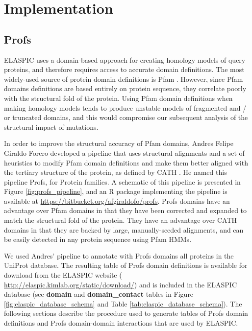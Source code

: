 
\chapter{Implementation} \label{ch:implementation}


\section{Profs} \label{sec:profs}

ELASPIC uses a domain-based approach for creating homology models of query proteins, and therefore requires access to accurate domain definitions. The most widely-used source of protein domain definitions is Pfam \cite{punta_pfam_2012}. However, since Pfam domains definitions are based entirely on protein sequence, they correlate poorly with the structural fold of the protein. Using Pfam domain definitions when making homology models tends to produce unstable models of fragmented and / or truncated domains, and this would compromise our subsequent analysis of the structural impact of mutations.

In order to improve the structural accuracy of Pfam domains, Andres Felipe Giraldo Forero developed a pipeline that uses structural alignments and a set of heuristics to modify Pfam domain definitions and make them better aligned with the tertiary structure of the protein, as defined by CATH \cite{cuff_extending_2011}. He named this pipeline Profs, for Protein families. A schematic of this pipeline is presented in Figure \ref{fig:profs_pipeline}, and an R package implementing the pipeline is available at \url{https://bitbucket.org/afgiraldofo/profs}. Profs domains have an advantage over Pfam domains in that they have been corrected and expanded to match the structural fold of the protein. They have an advantage over CATH domains in that they are backed by large, manually-seeded alignments, and can be easily detected in any protein sequence using Pfam HMMs.

We used Andres' pipeline to annotate with Profs domains all proteins in the UniProt database. The resulting table of Profs domain definitions is available for download from the ELASPIC website ( \url{http://elaspic.kimlab.org/static/download/}) and is included in the ELASPIC database (see \textbf{domain} and \textbf{domain\_contact} tables in Figure \ref{fig:elaspic_database_schema} and Table \ref{tab:elaspic_database_schema}). The following sections describe the procedure used to generate tables of Profs domain definitions and Profs domain-domain interactions that are used by ELASPIC.

